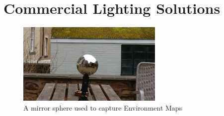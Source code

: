 \documentclass[ %
                    author={Gavin Parker},
                supervisor={Dr. Neill Campbell},
                    degree={MEng},
                     title={Deep Learning for Illumination Estimation from Stereo Images},
                  subtitle={},
                      type={Research},
                      year={2018} ]{dissertation}
\begin{document}
\section{Commercial Lighting Solutions}
\begin{figure}[H] 
\centering 
\includegraphics[width=7cm]{images/envmap} 
\caption{A mirror sphere used to capture Environment Maps} 
\label{fig:mirror_ball}
\end{figure} 
\end{document}
